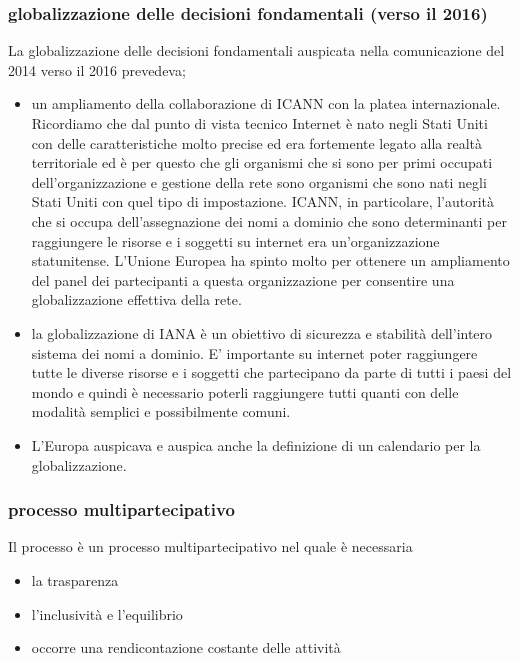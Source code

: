     \subsubsection{globalizzazione delle decisioni fondamentali (verso il 2016)}
    La globalizzazione delle decisioni fondamentali auspicata nella comunicazione del 2014 verso il 2016 prevedeva;
    \begin{itemize}
        \item un ampliamento della collaborazione di ICANN con la platea internazionale. Ricordiamo che dal punto di vista tecnico Internet è nato negli Stati Uniti con delle caratteristiche molto precise ed era fortemente legato alla realtà territoriale ed è per questo che gli organismi che si sono per primi occupati dell'organizzazione e gestione della rete sono organismi che sono nati negli Stati Uniti con quel tipo di impostazione. ICANN, in particolare, l'autorità che si occupa dell'assegnazione dei nomi a dominio che sono determinanti per raggiungere le risorse e i soggetti su internet era un'organizzazione statunitense. L'Unione Europea ha spinto molto per ottenere un ampliamento del panel dei partecipanti a questa organizzazione per consentire una globalizzazione effettiva della rete.
        \item la globalizzazione di IANA è un obiettivo di sicurezza e stabilità dell'intero sistema dei nomi a dominio. E' importante su internet poter raggiungere tutte le diverse risorse e i soggetti che partecipano da parte di tutti i paesi del mondo e quindi è necessario poterli raggiungere tutti quanti con delle modalità semplici e possibilmente comuni. 
        \item L'Europa auspicava e auspica anche la definizione di un calendario per la globalizzazione.
    \end{itemize}
     \par
     \subsubsection{processo multipartecipativo}
     
      Il processo è un processo multipartecipativo nel quale è necessaria 
      \begin{itemize}
          \item la trasparenza 
          \item l'inclusività  e l'equilibrio 
          \item occorre una rendicontazione costante delle attività
\end{itemize}

